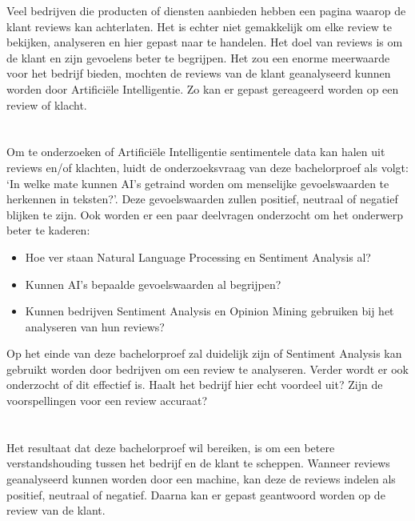 Veel bedrijven die producten of diensten aanbieden hebben een pagina waarop de klant reviews kan achterlaten. Het is echter niet gemakkelijk om elke review te bekijken, analyseren en hier gepast naar te handelen. Het doel van reviews is om de klant en zijn gevoelens beter te begrijpen. Het zou een enorme meerwaarde voor het bedrijf bieden, mochten de reviews van de klant geanalyseerd kunnen worden door Artificiële Intelligentie. Zo kan er gepast gereageerd worden op een review of klacht. 

\section{}
\label{sec:onderzoeksvraag}

Om te onderzoeken of Artificiële Intelligentie sentimentele data kan halen uit reviews en/of klachten, luidt de onderzoeksvraag van deze bachelorproef als volgt: `In welke mate kunnen AI's getraind worden om menselijke gevoelswaarden te herkennen in teksten?'. Deze gevoelswaarden zullen positief, neutraal of negatief blijken te zijn. Ook worden er een paar deelvragen onderzocht om het onderwerp beter te kaderen:

\begin{itemize}
    \item Hoe ver staan Natural Language Processing en Sentiment Analysis al?
    \item Kunnen AI's bepaalde gevoelswaarden al begrijpen?
    \item Kunnen bedrijven Sentiment Analysis en Opinion Mining gebruiken bij het analyseren van hun reviews?
\end{itemize}

Op het einde van deze bachelorproef zal duidelijk zijn of Sentiment Analysis kan gebruikt worden door bedrijven om een review te analyseren. Verder wordt er ook onderzocht of dit effectief is. Haalt het bedrijf hier echt voordeel uit? Zijn de voorspellingen voor een review accuraat?


\section{}
\label{sec:onderzoeksdoelstelling}

Het resultaat dat deze bachelorproef wil bereiken, is om een betere verstandshouding tussen het bedrijf en de klant te scheppen. Wanneer reviews geanalyseerd kunnen worden door een machine, kan deze de reviews indelen als positief, neutraal of negatief. Daarna kan er gepast geantwoord worden op de review van de klant. 

